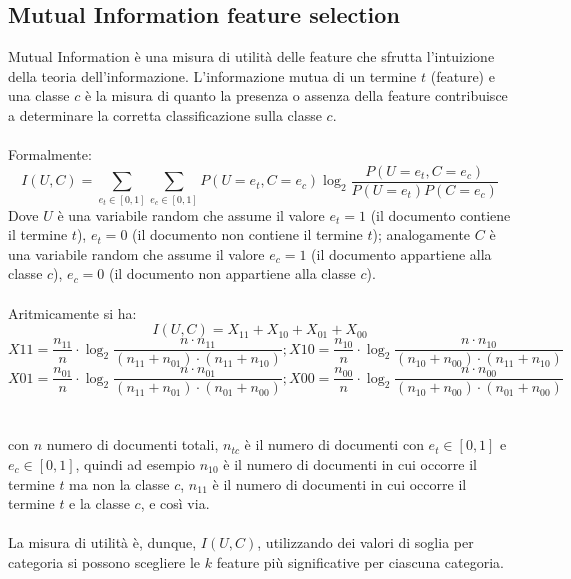 \documentclass{article}
\theoremstyle{plain}
\theoremstyle{definition}
\begin{document}
\subsection{Mutual Information feature selection}
Mutual Information è una misura di utilità delle feature che sfrutta l'intuizione della teoria dell'informazione. L'informazione mutua di un termine $t$ (feature) e una classe $c$ è la misura di quanto la presenza o assenza della feature contribuisce a determinare la corretta classificazione sulla classe $c$.
\\
\\
Formalmente:
$$I(U,C)=\sum_{e_t \in [0,1]} \sum_{e_c \in [0,1]} P(U=e_t, C=e_c) \log_2 \frac{P(U=e_t, C=e_c)}{P(U=e_t)P(C=e_c)}$$
Dove $U$ è una variabile random che assume il valore $e_t=1$ (il documento contiene il termine $t$), $e_t=0$ (il documento non contiene il termine $t$); analogamente $C$ è una variabile random che assume il valore $e_c=1$ (il documento appartiene alla classe $c$), $e_c=0$ (il documento non appartiene alla classe $c$).
\\
\\
Aritmicamente si ha:
$$I(U,C)=X_{11}+X_{10}+X_{01}+X_{00}$$
$$X{11}=\frac{n_{11}}{n} \cdot \log_2 \frac{n \cdot n_{11}}{(n_{11}+n_{01})\cdot(n_{11}+n_{10})};
X{10}=\frac{n_{10}}{n} \cdot \log_2 \frac{n \cdot n_{10}}{(n_{10}+n_{00})\cdot(n_{11}+n_{10})}$$
$$X{01}=\frac{n_{01}}{n} \cdot \log_2 \frac{n \cdot n_{01}}{(n_{11}+n_{01})\cdot(n_{01}+n_{00})};
X{00}=\frac{n_{00}}{n} \cdot \log_2 \frac{n \cdot n_{00}}{(n_{10}+n_{00})\cdot(n_{01}+n_{00})}$$
\\
\\
con $n$ numero di documenti totali, $n_{tc}$ è il numero di documenti con $e_t \in [0,1]$ e $e_c \in [0,1]$, quindi ad esempio $n_{10}$ è il numero di documenti in cui occorre il termine $t$ ma non la classe $c$, $n_{11}$ è il numero di documenti in cui occorre il termine $t$ e la classe $c$, e così via.
\\
\\
La misura di utilità è, dunque, $I(U,C)$, utilizzando dei valori di soglia per categoria si possono scegliere le $k$ feature più significative per ciascuna categoria.
\end{document}
